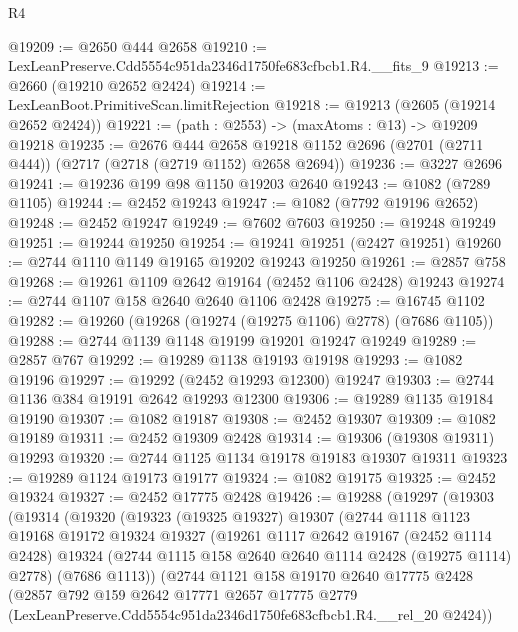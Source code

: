 \begin{lexlean}{R4}
\begin{coremodule}
@19209 := @2650 @444 @2658
@19210 := LexLeanPreserve.Cdd5554c951da2346d1750fe683cfbcb1.R4.__fits_9
@19213 := @2660 (@19210 @2652 @2424)
@19214 := LexLeanBoot.PrimitiveScan.limitRejection
@19218 := @19213 (@2605 (@19214 @2652 @2424))
@19221 := (path : @2553) -> (maxAtoms : @13) -> @19209 @19218
@19235 := @2676
    @444
    @2658
    @19218
    @1152
    @2696
    (@2701 (@2711 @444))
    (@2717 (@2718 (@2719 @1152) @2658 @2694))
@19236 := @3227 @2696
@19241 := @19236 @199 @98 @1150 @19203 @2640
@19243 := @1082 (@7289 @1105)
@19244 := @2452 @19243
@19247 := @1082 (@7792 @19196 @2652)
@19248 := @2452 @19247
@19249 := @7602 @7603
@19250 := @19248 @19249
@19251 := @19244 @19250
@19254 := @19241 @19251 (@2427 @19251)
@19260 := @2744 @1110 @1149 @19165 @19202 @19243 @19250
@19261 := @2857 @758
@19268 := @19261 @1109 @2642 @19164 (@2452 @1106 @2428) @19243
@19274 := @2744 @1107 @158 @2640 @2640 @1106 @2428
@19275 := @16745 @1102
@19282 := @19260 (@19268 (@19274 (@19275 @1106) @2778) (@7686 @1105))
@19288 := @2744 @1139 @1148 @19199 @19201 @19247 @19249
@19289 := @2857 @767
@19292 := @19289 @1138 @19193 @19198
@19293 := @1082 @19196
@19297 := @19292 (@2452 @19293 @12300) @19247
@19303 := @2744 @1136 @384 @19191 @2642 @19293 @12300
@19306 := @19289 @1135 @19184 @19190
@19307 := @1082 @19187
@19308 := @2452 @19307
@19309 := @1082 @19189
@19311 := @2452 @19309 @2428
@19314 := @19306 (@19308 @19311) @19293
@19320 := @2744 @1125 @1134 @19178 @19183 @19307 @19311
@19323 := @19289 @1124 @19173 @19177
@19324 := @1082 @19175
@19325 := @2452 @19324
@19327 := @2452 @17775 @2428
@19426 := @19288
    (@19297
      (@19303
        (@19314
          (@19320
            (@19323
              (@19325 @19327)
              @19307
              (@2744
                @1118
                @1123
                @19168
                @19172
                @19324
                @19327
                (@19261
                  @1117
                  @2642
                  @19167
                  (@2452 @1114 @2428)
                  @19324
                  (@2744 @1115 @158 @2640 @2640 @1114 @2428 (@19275 @1114) @2778)
                  (@7686 @1113))
                (@2744
                  @1121
                  @158
                  @19170
                  @2640
                  @17775
                  @2428
                  (@2857
                    @792
                    @159
                    @2642
                    @17771
                    @2657
                    @17775
                    @2779
                    (LexLeanPreserve.Cdd5554c951da2346d1750fe683cfbcb1.R4.__rel_20 @2424))

\end{coremodule}
\end{lexlean}
